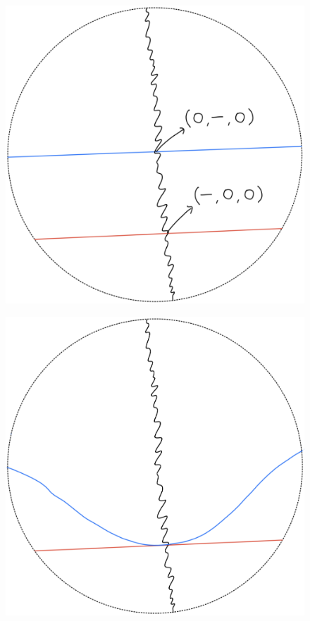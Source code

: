 \begin{definition}
\begin{enumerate}
\begin{itemize}
\begin{figure}[H]
    \centering
    \includegraphics[scale = 0.95]{diagrams/lemma1/13.png} 
    \caption{}
    \label{fig:your-label}
\end{figure}
\begin{figure}[H]
    \centering
    \includegraphics[scale = 0.95]{diagrams/lemma1/14.png} 

\end{figure}
\end{itemize}
\end{enumerate}
\end{definition}
